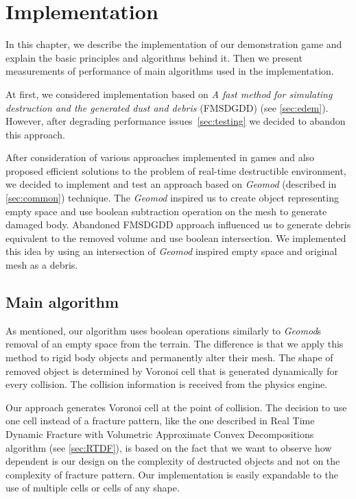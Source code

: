 \chapter{Implementation}
\label{chaptImplementation}
In this chapter, we describe the implementation of our demonstration game and explain the basic principles and algorithms behind it. Then we present measurements of performance of main algorithms used in the implementation.

At first, we considered implementation based on \emph{A fast method for simulating destruction and the generated dust and debris} (FMSDGDD) (see \cref{sec:edem}). However, after degrading performance issues~\cref{sec:testing} we decided to abandon this approach.

After consideration of various approaches implemented in games and also proposed efficient solutions to the problem of real-time destructible environment, we decided to implement and test an approach based on \emph{Geomod} (described in \cref{sec:common}) technique. The \emph{Geomod} inspired us to create object representing empty space and use boolean subtraction operation on the mesh to generate damaged body. Abandoned FMSDGDD approach influenced us to generate debris equivalent to the removed volume and use boolean intersection. We implemented this idea by using an intersection of \emph{Geomod} inspired empty space and original mesh as a debris.

\section{Main algorithm}
As mentioned, our algorithm uses boolean operations similarly to \emph{Geomod}s removal of an empty space from the terrain. The difference is that we apply this method to rigid body objects and permanently alter their mesh. The shape of removed object is determined by Voronoi cell that is generated dynamically for every collision. The collision information is received from the physics engine.

Our approach generates Voronoi cell at the point of collision. The decision to use one cell instead of a fracture pattern, like the one described in Real Time Dynamic Fracture with Volumetric Approximate Convex Decompositions algorithm (see \cref{sec:RTDF}), is based on the fact that we want to observe how dependent is our design on the complexity of destructed objects and not on the complexity of fracture pattern. Our implementation is easily expandable to the use of multiple cells or cells of any shape. 

